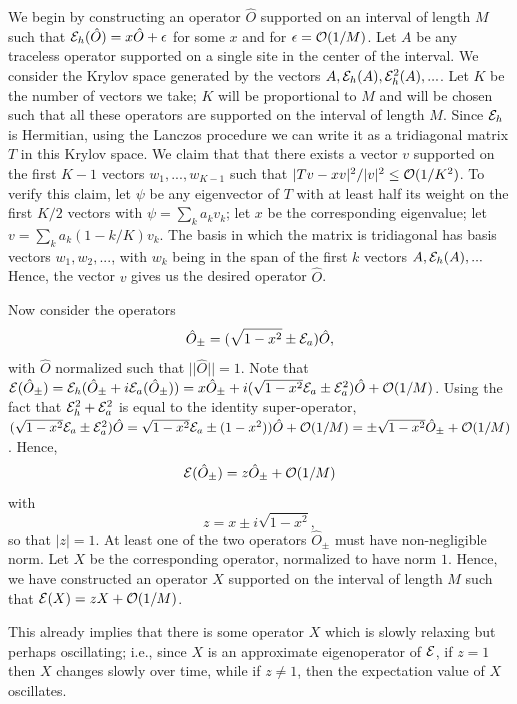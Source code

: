 \documentclass[twocolumn,superscriptaddress, prb]{revtex4-1}
\newcommand{\be}{\begin{equation}}
\newcommand{\ee}{\end{equation}}
\begin{document}
We begin by constructing an operator $\hat{O}$ supported on an interval of length $M$ such that ${\cal E}_h(\hat{O})= x \hat{O}+\epsilon$ for some $x$ and for $\epsilon={\cal O}(1/M)$.  Let $A$ be any traceless operator supported on a single site in the center of the interval.  We consider the Krylov space generated by the vectors $A, {\cal E}_h(A), {\cal E}_h^2(A),...$.  Let $K$ be the number of vectors we take; $K$ will be proportional to $M$ and will be chosen such that all these operators are supported on the interval of length $M$.
Since ${\cal E}_h$ is Hermitian, using the Lanczos procedure we can write it as a tridiagonal matrix $T$ in this Krylov space.   We claim that that there exists a vector $v$ supported on the first $K-1$ vectors $w_1,...,w_{K-1}$ such that $|Tv-xv|^2/|v|^2\leq {\cal O}(1/K^2)$.  To verify this claim, let $\psi$ be any eigenvector of $T$ with at least half its weight on the first $K/2$ vectors with $\psi=\sum_k a_k v_k$; let $x$ be the corresponding eigenvalue; let $v=\sum_k a_k (1-k/K) v_k$.
The basis in which the matrix is tridiagonal has basis vectors $w_1,w_2,...$, with $w_k$ being in the span of the first $k$ vectors $A, {\cal E}_h(A),...$
Hence, the vector $v$ gives us the desired operator $\hat{O}$.

Now consider the operators
\be
\hat{O}_{\pm}=(\sqrt{1-x^2} \pm {\cal E}_a) \hat{O},
\ee
with $\hat{O}$ normalized such that $||\hat{O}||=1$.
Note that ${\cal E}(\hat{O}_{\pm})={\cal E}_h(\hat{O}_{\pm}+i {\cal E}_a(\hat{O}_{\pm}))=x\hat{O}_{\pm}+i(\sqrt{1-x^2}{\cal E}_a \pm {\cal E}_a^2) \hat{O} + {\cal O}(1/M)$.  Using
the fact that ${\cal E}_h^2+{\cal E}_a^2$ is equal to the identity super-operator, $(\sqrt{1-x^2}{\cal E}_a \pm {\cal E}_a^2) \hat{O}=\sqrt{1-x^2}{\cal E}_a \pm (1-x^2) ) \hat{O} +{\cal O}(1/M)=\pm\sqrt{1-x^2}\hat{O}_{\pm}+{\cal O}(1/M)$.
Hence,
\be
{\cal E}(\hat{O}_{\pm})=z \hat{O}_{\pm}+{\cal O}(1/M)
\ee
with
\be
z=x\pm i \sqrt{1-x^2},
\ee
so that $|z|=1$.
At least one of the two operators $\hat{O}_{\pm}$ must have non-negligible norm.  Let $X$ be the corresponding operator, normalized to have norm $1$.  Hence, we have constructed an operator $X$ supported on the interval of length $M$ such that ${\cal E}(X)=z X + {\cal O}(1/M)$.

This already implies that there is some operator $X$ which is slowly relaxing but perhaps oscillating; i.e., since $X$ is an approximate eigenoperator of ${\cal E}$, if $z=1$ then $X$ changes slowly over time, while if $z \neq 1$, then the expectation value of $X$ oscillates.
\end{document}
